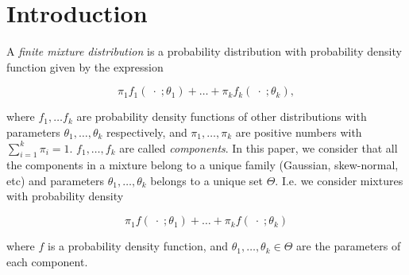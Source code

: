 \documentclass[10pt, a4paper]{article}
\begin{document}

\section{Introduction}

\noindent  A \emph{finite mixture distribution} is a probability distribution with probability density function given by the expression

\[
\pi_1 f_1(\;\cdot\; ; \theta_1) + \dots + \pi_k f_k(\;\cdot\; ; \theta_k),
\]

where $f_1, \dots f_k$ are probability density functions of other distributions with parameters $\theta_1, \dots, \theta_k$ respectively, and $\pi_1, \dots, \pi_k$ are positive numbers with $\sum_{i=1}^k \pi_i = 1$. $f_1, \dots, f_k$ are called \emph{components}. In this paper, we consider that all the components in a mixture belong to a unique family (Gaussian, skew-normal, etc) and parameters $\theta_1, \dots, \theta_k$ belongs to a unique set $\Theta$. I.e. we consider mixtures with probability density

\begin{equation}\label{mixt}
\pi_1 f(\;\cdot\; ; \theta_1) + \dots + \pi_k f(\;\cdot\; ; \theta_k)
\end{equation}

where $f$ is a probability density function, and $\theta_1, \dots, \theta_k \in \Theta$ are the parameters of each component.
\end{document}
